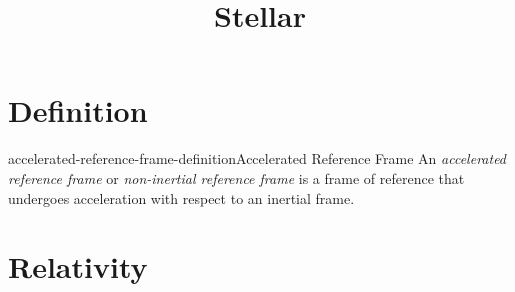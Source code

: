 \documentclass[preview]{standalone}
\begin{document}
\title{Stellar}
\genpage

\section{Definition}

\begin{snippetdefinition}{accelerated-reference-frame-definition}{Accelerated Reference Frame}
    An \emph{accelerated reference frame} or \emph{non-inertial reference frame}
    is a frame of reference that undergoes acceleration with respect to an inertial frame.
\end{snippetdefinition}

\section{Relativity}
\end{document}
